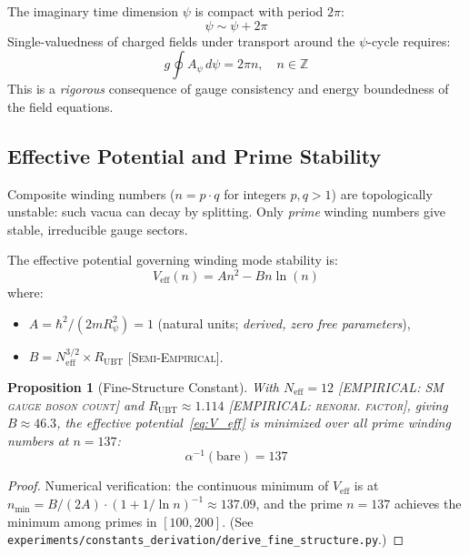 \documentclass[12pt,a4paper]{article}
\newtheorem{proposition}[theorem]{Proposition}
\begin{document}
The imaginary time dimension $\psi$ is compact with period $2\pi$:
\begin{equation}
  \psi \sim \psi + 2\pi
\end{equation}
Single-valuedness of charged fields under transport around the $\psi$-cycle requires:
\begin{equation}
  \label{eq:dirac_quant}
  g\oint A_\psi\,d\psi = 2\pi n, \quad n \in \mathbb{Z}
\end{equation}
This is a \emph{rigorous} consequence of gauge consistency and energy boundedness
of the field equations.

\subsection{Effective Potential and Prime Stability}

Composite winding numbers ($n = p\cdot q$ for integers $p,q > 1$) are
topologically unstable: such vacua can decay by splitting. Only \emph{prime}
winding numbers give stable, irreducible gauge sectors.

The effective potential governing winding mode stability is:
\begin{equation}
  \label{eq:V_eff}
  V_\text{eff}(n) = A n^2 - B n\ln(n)
\end{equation}
where:
\begin{itemize}
  \item $A = \hbar^2/(2mR_\psi^2) = 1$ (natural units; \emph{derived, zero free parameters}),
  \item $B = N_\text{eff}^{3/2} \times R_\text{UBT}$ \textsc{[Semi-Empirical]}.
\end{itemize}

\begin{proposition}[Fine-Structure Constant]
\label{prop:alpha}
With $N_\text{eff} = 12$ \textsc{[EMPIRICAL: SM gauge boson count]} and
$R_\text{UBT} \approx 1.114$ \textsc{[EMPIRICAL: renorm. factor]},
giving $B \approx 46.3$, the effective potential~\eqref{eq:V_eff} is minimized
over all prime winding numbers at $n = 137$:
\begin{equation}
  \label{eq:alpha_result}
  \alpha^{-1}(\text{bare}) = 137
\end{equation}
\end{proposition}

\begin{proof}
Numerical verification: the continuous minimum of $V_\text{eff}$ is at
$n_\text{min} = B/(2A) \cdot (1 + 1/\ln n)^{-1} \approx 137.09$, and the
prime $n = 137$ achieves the minimum among primes in $[100, 200]$.
(See \texttt{experiments/constants\_derivation/derive\_fine\_structure.py}.)
\end{proof}
\end{document}
